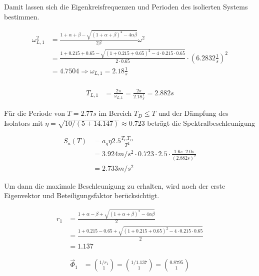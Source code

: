 Damit lassen sich die Eigenkreisfrequenzen und Perioden des isolierten Systems bestimmen.

\begin{align*}
\omega_{L,1}^2 &= \frac{1 + \alpha + \beta - \sqrt{(1 + \alpha + \beta)^2 - 4 \alpha \beta}}{2 \beta} \omega^2\\
               &= \frac{1 + 0.215 + 0.65 - \sqrt{(1 + 0.215 + 0.65)^2 - 4 \cdot 0.215 \cdot 0.65}}{2 \cdot 0.65} \cdot (6.2832 \frac{1}{s})^2\\
               &= 4.7504 \Rightarrow  \omega_{L,1} = 2.18 \frac{1}{s}\\
\end{align*}

\begin{align*}
T_{L,1} &= \frac{2 \pi}{\omega_{L,1}} = \frac{2 \pi}{2.18 \frac{1}{s}} = 2.882 s
\end{align*}

Für die Periode von $T = 2.77 s$ im Bereich $T_D \leq T$ und der Dämpfung des Isolators mit $\eta=\sqrt{10/(5+14.147)} \approx 0.723$ beträgt die Spektralbeschleunigung

\begin{align*}
S_a(T) &= a_g \eta 2.5 \frac{T_C T_D}{T^2}\\
       &= 3.924 m/s^2 \cdot 0.723 \cdot 2.5 \cdot \frac{1.6 s \cdot 2.0 s}{(2.882 s)^2}\\
       &= 2.733 m/s^2
\end{align*}

Um dann die maximale Beschleunigung zu erhalten, wird noch der erste Eigenvektor und Beteiligungsfaktor berücksichtigt.

\begin{align*}
r_1 &= \frac{1 + \alpha - \beta + \sqrt{(1 + \alpha + \beta)^2 - 4 \alpha \beta}}{2} \\
    &= \frac{1 + 0.215 - 0.65 + \sqrt{(1 + 0.215 + 0.65)^2 - 4 \cdot 0.215 \cdot 0.65}}{2}\\
    &= 1.137
\end{align*}

\begin{align*}
\vec{\Phi}_1 &= \binom{1/r_1}{1} = \binom{1/1.137}{1} = \binom{0.8795}{1}
\end{align*}

